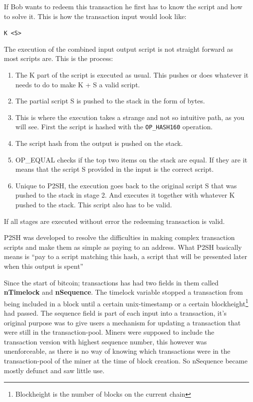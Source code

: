 If Bob wants to redeem this transaction he first has to know the script and how to solve it. This is how the transaction input would look like: 

\texttt{K <S>}

The execution of the combined input output script is not straight forward as most scripts are. This is the process:
\begin{enumerate}
	\item The K part of the script is executed as usual. This pushes or does whatever it needs to do to make K + S a valid script.
	\item The partial script S is pushed to the stack in the form of bytes.
	\item This is where the execution takes a strange and not so intuitive path, as you will see. First the script is hashed with the \texttt{OP\_HASH160} operation.
	\item The script hash from the output is pushed on the stack.
	\item OP\_EQUAL checks if the top two items on the stack are equal. If they are it means that the script S provided in the input is the correct script.
	\item Unique to P2SH, the execution goes back to the original script S that was pushed to the stack in stage 2. And executes it together with whatever K pushed to the stack. This script also has to be valid.\cite{scripthash} 
\end{enumerate}

If all stages are executed without error the redeeming transaction is valid. 

P2SH was developed to resolve the difficulties in making complex transaction scripts and make them as simple as paying to an address. What P2SH basically means is \enquote{pay to a script matching this hash, a script that will be presented later when this output is spent}\cite{antonopoulos_2017}\cite{scripthash}

Since the start of bitcoin; transactions has had two fields in them called \textbf{nTimelock} and \textbf{nSequence}. The timelock variable stopped a transaction from being  included in a block until a certain unix-timestamp or a certain blockheight\footnote{Blockheight is the number of blocks on the current chain} had passed. The sequence field is part of each input into a transaction, it's original purpose was to give users a mechanism for updating a transaction that were still in the transaction-pool. Miners were supposed to include the transaction version with highest sequence number, this however was unenforceable, as there is no way of knowing which transactions were in the transaction-pool of the miner at the time of block creation. So nSequence became mostly defunct and saw little use.

